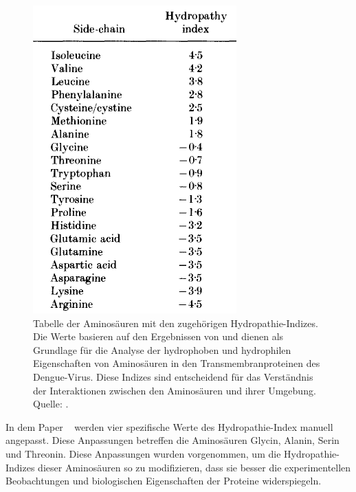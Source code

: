 \documentclass[german,version-2022-01]{uzl-thesis}
\begin{document}
\begin{figure}[tbp]
  \centering
  \includegraphics[scale=0.75]{Images/Hydropathy_scores_Paper.png}
  \caption{Tabelle der Aminos\"auren mit den zugeh\"origen Hydropathie-Indizes. Die Werte basieren auf den Ergebnissen von \citeauthor{kyte_simple_1982} und dienen als Grundlage f\"ur die Analyse der hydrophoben und hydrophilen Eigenschaften von Aminos\"auren in den Transmembranproteinen des Dengue-Virus. Diese Indizes sind entscheidend f\"ur das Verst\"andnis der Interaktionen zwischen den Aminos\"auren und ihrer Umgebung. Quelle:  \cite{kyte_simple_1982}.}
  \label{fig:Hydropathieindexe}
\end{figure}
In dem Paper ~\cite{kyte_simple_1982} werden vier spezifische Werte des Hydropathie-Index manuell angepasst. Diese Anpassungen betreffen die Aminos\"auren Glycin, Alanin, Serin und Threonin. Diese Anpassungen wurden vorgenommen, um die Hydropathie-Indizes dieser Aminos\"auren so zu modifizieren, dass sie besser die experimentellen Beobachtungen und biologischen Eigenschaften der Proteine widerspiegeln.
\end{document}
